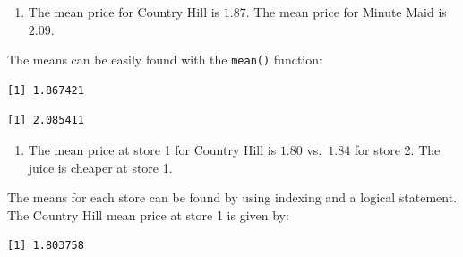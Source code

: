 \documentclass[
  letterpaper,
  DIV=11,
  numbers=noendperiod]{scrreprt}
\newenvironment{Shaded}{\begin{snugshade}}{\end{snugshade}}
\newcommand{\DecValTok}[1]{\textcolor[rgb]{0.68,0.00,0.00}{#1}}
\newcommand{\FunctionTok}[1]{\textcolor[rgb]{0.28,0.35,0.67}{#1}}
\newcommand{\NormalTok}[1]{\textcolor[rgb]{0.00,0.23,0.31}{#1}}
\newcommand{\SpecialCharTok}[1]{\textcolor[rgb]{0.37,0.37,0.37}{#1}}
\providecommand{\tightlist}{%
  \setlength{\itemsep}{0pt}\setlength{\parskip}{0pt}}\usepackage{longtable,booktabs,array}
\begin{document}
\begin{enumerate}
\def\labelenumi{\arabic{enumi}.}
\tightlist
\item
  The mean price for Country Hill is \(1.87\). The mean price for Minute
  Maid is \(2.09\).
\end{enumerate}

The means can be easily found with the \texttt{mean()} function:

\begin{Shaded}
\end{Shaded}

\begin{verbatim}
[1] 1.867421
\end{verbatim}

\begin{Shaded}
\end{Shaded}

\begin{verbatim}
[1] 2.085411
\end{verbatim}

\begin{enumerate}
\def\labelenumi{\arabic{enumi}.}
\setcounter{enumi}{1}
\tightlist
\item
  The mean price at store 1 for Country Hill is \(1.80\) vs.~\(1.84\)
  for store 2. The juice is cheaper at store 1.
\end{enumerate}

The means for each store can be found by using indexing and a logical
statement. The Country Hill mean price at store 1 is given by:

\begin{Shaded}
\end{Shaded}

\begin{verbatim}
[1] 1.803758
\end{verbatim}
\end{document}
